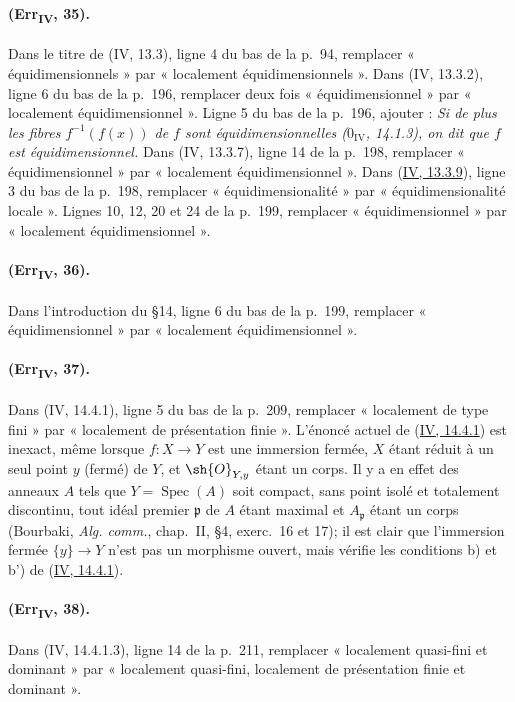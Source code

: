 \paragraph{(Err\textsubscript{IV}, 35).}
Dans le titre de (IV, 13.3), ligne 4 du bas de la p.~94, remplacer
« équidimensionnels » par « localement équidimensionnels ». Dans
(IV, 13.3.2), ligne 6 du bas de la p.~196, remplacer deux fois
« équidimensionnel » par « localement équidimensionnel ». Ligne 5 du bas
de la p.~196, ajouter : \emph{Si de plus les fibres $f^{-1}(f(x))$ de
$f$ sont équidimensionnelles ($0_{\mathrm{IV}}$, 14.1.3), on dit que
$f$ est équidimensionnel.} Dans (IV, 13.3.7), ligne 14 de la p.~198,
remplacer « équidimensionnel » par « localement équidimensionnel ».
Dans ({\hyperlink{ega4.c04.statement.13-3-9}{IV, 13.3.9}}), ligne 3 du
bas de la p.~198, remplacer « équidimensionalité » par
« équidimensionalité locale ». Lignes 10, 12, 20 et 24 de la p.~199,
remplacer « équidimensionnel » par « localement équidimensionnel ».

\paragraph{(Err\textsubscript{IV}, 36).}
Dans l'introduction du \S14, ligne 6 du bas de la p.~199, remplacer
« équidimensionnel » par « localement équidimensionnel ».

\paragraph{(Err\textsubscript{IV}, 37).}
Dans (IV, 14.4.1), ligne 5 du bas de la p.~209, remplacer « localement
de type fini » par « localement de présentation finie ». L'énoncé
actuel de ({\hyperlink{ega4.c04.thm.14-4-1}{IV, 14.4.1}}) est inexact,
même lorsque $f:X\to Y$ est une immersion fermée, $X$ étant réduit à
un seul point $y$ (fermé) de $Y$, et $\sh{O}_{Y,y}$ étant un corps. Il
y a en effet des anneaux $A$ tels que $Y=\operatorname{Spec}(A)$ soit
compact, sans point isolé et totalement discontinu, tout idéal premier
$\mathfrak p$ de $A$ étant maximal et $A_\mathfrak p$ étant un corps
(Bourbaki, \emph{Alg. comm.}, chap.~II, \S4, exerc.~16 et 17); il est
clair que l'immersion fermée $\{y\}\to Y$ n'est pas un morphisme
ouvert, mais vérifie les conditions b) et b') de
({\hyperlink{ega4.c04.thm.14-4-1}{IV, 14.4.1}}).

\paragraph{(Err\textsubscript{IV}, 38).}
Dans (IV, 14.4.1.3), ligne 14 de la p.~211, remplacer « localement
quasi-fini et dominant » par « localement quasi-fini, localement de
présentation finie et dominant ».

